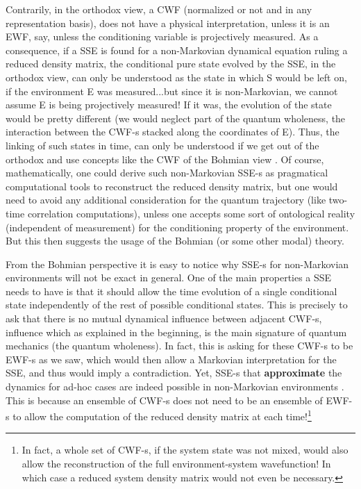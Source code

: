 \documentclass[11pt, a4paper]{article} %
\begin{document}
Contrarily, in the orthodox view, a CWF (normalized or not and in any representation basis), does not have a physical interpretation, unless it is an EWF, say, unless the conditioning variable is projectively measured. As a consequence, if a SSE is found for a non-Markovian dynamical equation ruling a reduced density matrix, the conditional pure state evolved by the SSE, in the orthodox view, can only be understood as the state in which S would be left on, if the environment E was measured...but since it is non-Markovian, we cannot assume E is being projectively measured! If it was, the evolution of the state would be pretty different (we would neglect part of the quantum wholeness, the interaction between the CWF-s stacked along the coordinates of E). Thus, the linking of such states in time, can only be understood if we get out of the orthodox and use concepts like the CWF of the Bohmian view \cite{NMisModal, interpretSSE}. Of course, mathematically, one could derive such non-Markovian SSE-s as pragmatical computational tools to reconstruct the reduced density matrix, but one would need to avoid any additional consideration for the quantum trajectory (like two-time correlation computations), unless one accepts some sort of ontological reality (independent of measurement) for the conditioning property of the environment. But this then suggests the usage of the Bohmian (or some other modal) theory.

From the Bohmian perspective it is easy to notice why SSE-s for non-Markovian environments will not be exact in general. One of the main properties a SSE needs to have is that it should allow the time evolution of a single conditional state independently of the rest of possible conditional states. This is precisely to ask that there is no mutual dynamical influence between adjacent CWF-s, influence which as explained in the beginning, is the main signature of quantum mechanics (the quantum wholeness). In fact, this is asking for these CWF-s to be EWF-s as we saw, which would then allow a Markovian interpretation for the SSE, and thus would imply a contradiction. Yet, SSE-s that {\bf approximate} the dynamics for ad-hoc cases are indeed possible in non-Markovian environments \cite{ Diosi, WisemanSSE, Thz}. This is because an ensemble of CWF-s does not need to be an ensemble of EWF-s to allow the computation of the reduced density matrix at each time!\footnote{In fact, a whole set of CWF-s, if the system state was not mixed, would also allow the reconstruction of the full environment-system wavefunction! In which case a reduced system density matrix would not even be necessary.} 
\end{document}
